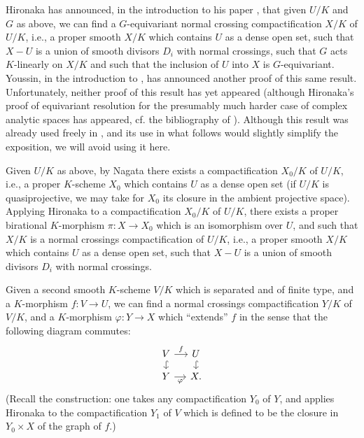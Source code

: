 Hironaka has announced, in the introduction to his paper \cite{Hir-IES}, that given \(U/K\) and \(G\) as above, we can find a \(G\)-equivariant normal crossing compactification \(X/K\) of \(U/K\), i.e., a proper smooth \(X/K\) which contains \(U\) as a dense open set, such that \(X-U\) is a union of smooth divisors \(D_i\) with normal crossings, such that \(G\) acts \(K\)-linearly on \(X/K\) and such that the inclusion of \(U\) into \(X\) is \(G\)-equivariant. Youssin, in the introduction to \cite{You}, has announced another proof of this same result. Unfortunately, neither proof of this result has yet appeared (although Hironaka's proof of equivariant resolution for the presumably much harder case of complex analytic spaces has appeared, cf. the bibliography of \cite{Hir-IES}). Although this result was already used freely in \cite{Ka-ASDE}, and its use in what follows would slightly simplify the exposition, we will avoid using it here.

Given \(U/K\) as above, by Nagata \cite{Na} there exists a compactification \(X_0/K\) of \(U/K\), i.e., a proper \(K\)-scheme \(X_0\) which contains \(U\) as a dense open set (if \(U/K\) is quasiprojective, we may take for \(X_0\) its closure in the ambient projective space). Applying Hironaka \cite[Corollary~3 of Theorem~2]{Hir-RS} to a compactification \(X_0/K\) of \(U/K\), there exists a proper birational \(K\)-morphism \(\pi:X\to X_0\) which is an isomorphism over \(U\), and such that \(X/K\) is a normal crossings compactification of \(U/K\), i.e., a proper smooth \(X/K\) which contains \(U\) as a dense open set, such that \(X-U\) is a union of smooth divisors \(D_i\) with normal crossings.

Given a second smooth \(K\)-scheme \(V/K\) which is separated and of finite type, and a \(K\)-morphism \(f:V\to U\), we can find a normal crossings compactification \(Y/K\) of \(V/K\), and a \(K\)-morphism \(\varphi:Y\to X\) which ``extends'' \(f\) in the sense that the following diagram commutes:
\[
\begin{tikzcd}[column sep=small,row sep=small]
V \arrow[r,"f"] \arrow[d,hook] & U \arrow[d,hook]\\
Y \arrow[r,"\varphi"'] & X.
\end{tikzcd}
\]
(Recall the construction: one takes any compactification \(Y_0\) of \(Y\), and applies Hironaka \cite[Corollary~3 of Theorem~2]{Hir-RS} to the compactification \(Y_1\) of \(V\) which is defined to be the closure in \(Y_0\times X\) of the graph of \(f\).)

